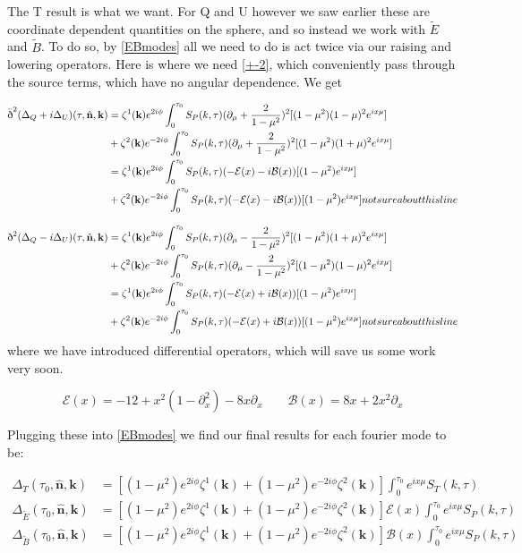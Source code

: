 \documentclass[a4paper,11pt]{article}
\renewcommand{\v}[1]{\mathbf{#1}}
\newcommand{\unit}[1]{\hat{\v{#1}}}
\newcommand{\sr}{\text{\normalfont\dh}}
\renewcommand{\sl}{\bar{\text{\normalfont\dh}}}
\begin{document}
The T result is what we want. For Q and U however we saw earlier these are coordinate dependent quantities on the sphere, and so instead we work with $\tilde{E}$ and $\tilde{B}$. To do so, by \ref{EBmodes} all we need to do is act twice via our raising and lowering operators. Here is where we need \ref{+-2}, which conveniently pass through the source terms, which have no angular dependence. We get

\begin{align}
\sl^2(\Delta_Q+i\Delta_U)(\tau,\unit{n},\v{k}) &= \zeta^1(\v{k})e^{2i\phi}\int_0^{\tau_0}S_P(k,\tau)(\partial_\mu+\frac{2}{1-\mu^2})^2[(1-\mu^2)(1-\mu)^2 e^{ix\mu}]\\
&{} + \zeta^2(\v{k})e^{-2i\phi}\int_0^{\tau_0}S_P(k,\tau)(\partial_\mu+\frac{2}{1-\mu^2})^2[(1-\mu^2)(1+\mu)^2 e^{ix\mu}]\\
&= \zeta^1(\v{k})e^{2i\phi}\int_0^{\tau_0}S_P(k,\tau)(-\mathcal{E}(x)-i\mathcal{B}(x))[(1-\mu^2) e^{ix\mu}] \\
&{} + \zeta^2(\v{k})e^{-2i\phi}\int_0^{\tau_0}S_P(k,\tau)(-\mathcal{E}(x)-i\mathcal{B}(x))[(1-\mu^2) e^{ix\mu}] not sure about this line
\end{align}

\begin{align}
\sr^2(\Delta_Q-i\Delta_U)(\tau,\unit{n},\v{k}) &= \zeta^1(\v{k})e^{2i\phi}\int_0^{\tau_0}S_P(k,\tau)(\partial_\mu-\frac{2}{1-\mu^2})^2[(1-\mu^2)(1+\mu)^2 e^{ix\mu}] \\ 
&{} + \zeta^2(\v{k})e^{-2i\phi}\int_0^{\tau_0}S_P(k,\tau)(\partial_\mu-\frac{2}{1-\mu^2})^2[(1-\mu^2)(1-\mu)^2 e^{ix\mu}]\\
&= \zeta^1(\v{k})e^{2i\phi}\int_0^{\tau_0}S_P(k,\tau)(-\mathcal{E}(x)+i\mathcal{B}(x))[(1-\mu^2) e^{ix\mu}] \\
&{} + \zeta^2(\v{k})e^{-2i\phi}\int_0^{\tau_0}S_P(k,\tau)(-\mathcal{E}(x)+i\mathcal{B}(x))[(1-\mu^2) e^{ix\mu}] not sure about this line
\end{align}
where we have introduced differential operators, which will save us some work very soon.

\begin{equation}
\mathcal{E}(x)=-12+x^2(1-\partial^2_x)-8x\partial_x \qquad \mathcal{B}(x) = 8x+2x^2\partial_x
\end{equation}

Plugging these into \ref{EBmodes} we find our final results for each fourier mode to be:

\begin{align}
\Delta_T(\tau_0,\unit{n},\v{k}) &= [(1-\mu^2) e^{2i\phi} \zeta^1(\v{k})+(1-\mu^2) e^{-2i\phi} \zeta^2(\v{k})]\int_0^{\tau_0} e^{ix\mu}S_T(k,\tau)\\
\Delta_{\tilde{E}}(\tau_0,\unit{n},\v{k}) &= [(1-\mu^2) e^{2i\phi} \zeta^1(\v{k})+(1-\mu^2) e^{-2i\phi} \zeta^2(\v{k})]\mathcal{E}(x)\int_0^{\tau_0} e^{ix\mu}S_P(k,\tau)\\
\Delta_{\tilde{B}}(\tau_0,\unit{n},\v{k}) &= [(1-\mu^2) e^{2i\phi} \zeta^1(\v{k})+(1-\mu^2) e^{-2i\phi} \zeta^2(\v{k})]\mathcal{B}(x)\int_0^{\tau_0} e^{ix\mu}S_P(k,\tau)
\end{align}
\end{document}
